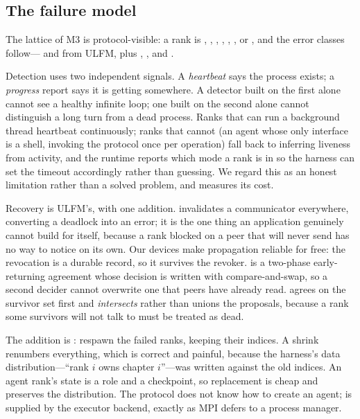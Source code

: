 \subsection{The failure model}
\label{sec:ft}

The lattice of M3 is protocol-visible: a rank is ,
, , , ,
,  or , and the error classes
follow--- and  from ULFM, plus
, ,  and
.

Detection uses two independent signals. A \emph{heartbeat} says the process
exists; a \emph{progress} report says it is getting somewhere. A detector
built on the first alone cannot see a healthy infinite loop; one built on
the second alone cannot distinguish a long turn from a dead process. Ranks
that can run a background thread heartbeat continuously; ranks that cannot
(an agent whose only interface is a shell, invoking the protocol once per
operation) fall back to inferring liveness from activity, and the runtime
reports which mode a rank is in so the harness can set the timeout
accordingly rather than guessing. We regard this as an honest limitation
rather than a solved problem, and  measures its cost.

Recovery is ULFM's, with one addition.  invalidates a
communicator everywhere, converting a deadlock into an error; it is the one
thing an application genuinely cannot build for itself, because a rank
blocked on a peer that will never send has no way to notice on its own. Our
devices make propagation reliable for free: the revocation is a durable
record, so it survives the revoker.  is a two-phase
early-returning agreement whose decision is written with compare-and-swap,
so a second decider cannot overwrite one that peers have already read.
 agrees on the survivor set first and \emph{intersects}
rather than unions the proposals, because a rank some survivors will not
talk to must be treated as dead.

The addition is : respawn the failed ranks, keeping their
indices. A shrink renumbers everything, which is correct and painful,
because the harness's data distribution---``rank $i$ owns chapter
$i$''---was written against the old indices. An agent rank's state is a role
and a checkpoint, so replacement is cheap and preserves the distribution.
The protocol does not know how to create an agent;  is supplied
by the executor backend, exactly as MPI defers to a process manager.

